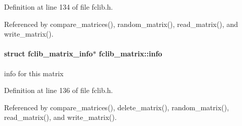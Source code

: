 Definition at line 134 of file fclib.\+h.



Referenced by compare\+\_\+matrices(), random\+\_\+matrix(), read\+\_\+matrix(), and write\+\_\+matrix().

\hypertarget{structfclib__matrix_ac0af227334c5b0a13a3222c8f04add36}{}
\paragraph[{info}]{\setlength{\rightskip}{0pt plus 5cm}struct {\bf fclib\+\_\+matrix\+\_\+info}$\ast$ fclib\+\_\+matrix\+::info}\label{structfclib__matrix_ac0af227334c5b0a13a3222c8f04add36}


info for this matrix 



Definition at line 136 of file fclib.\+h.



Referenced by compare\+\_\+matrices(), delete\+\_\+matrix(), random\+\_\+matrix(), read\+\_\+matrix(), and write\+\_\+matrix().

